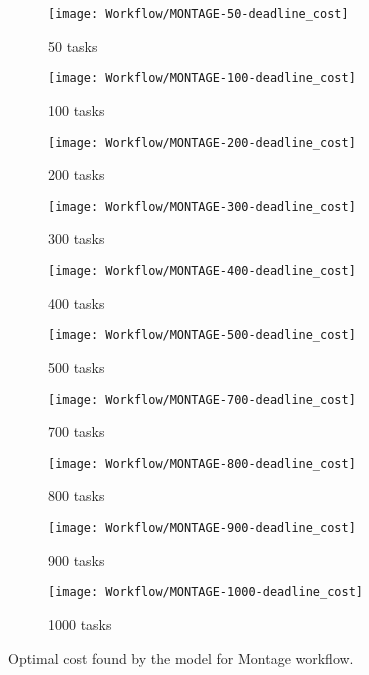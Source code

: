 {     \begin{figure}[tb] 
       \centering       
       \begin{subfigure}[b]{0.45\textwidth}
         \texttt{[image: Workflow/MONTAGE-50-deadline\_cost]}
         \caption{50 tasks}
       \end{subfigure}
       \begin{subfigure}[b]{0.45\textwidth}
         \texttt{[image: Workflow/MONTAGE-100-deadline\_cost]}
         \caption{100 tasks}
       \end{subfigure}
       \begin{subfigure}[b]{0.45\textwidth}
         \texttt{[image: Workflow/MONTAGE-200-deadline\_cost]}
         \caption{200 tasks}
       \end{subfigure}
       \begin{subfigure}[b]{0.45\textwidth}
         \texttt{[image: Workflow/MONTAGE-300-deadline\_cost]}
         \caption{300 tasks}
       \end{subfigure}
       \begin{subfigure}[b]{0.45\textwidth}
         \texttt{[image: Workflow/MONTAGE-400-deadline\_cost]}
         \caption{400 tasks}
       \end{subfigure}
       \begin{subfigure}[b]{0.45\textwidth}
         \texttt{[image: Workflow/MONTAGE-500-deadline\_cost]}
         \caption{\label{fig:workflow:montage-500}500 tasks}
       \end{subfigure}
       \begin{subfigure}[b]{0.45\textwidth}
         \texttt{[image: Workflow/MONTAGE-700-deadline\_cost]}
         \caption{700 tasks}
       \end{subfigure}
       \begin{subfigure}[b]{0.45\textwidth}
         \texttt{[image: Workflow/MONTAGE-800-deadline\_cost]}
         \caption{800 tasks}
       \end{subfigure}
       \begin{subfigure}[b]{0.45\textwidth}
         \texttt{[image: Workflow/MONTAGE-900-deadline\_cost]}
         \caption{900 tasks}
       \end{subfigure}
       \begin{subfigure}[b]{0.45\textwidth}
         \texttt{[image: Workflow/MONTAGE-1000-deadline\_cost]}
         \caption{1000 tasks}
       \end{subfigure}
       \caption{Optimal cost found by the model for Montage workflow.}
       \label{fig:workflow:montage}
     \end{figure}
     
}
